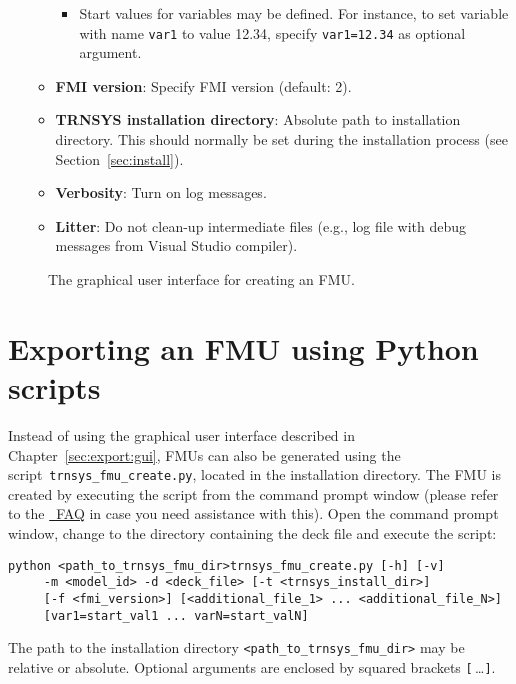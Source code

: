 \begin{enumerate}
\begin{itemize}
\begin{itemize}
      \item Start values for variables may be defined. For instance, to set variable with name \verb!var1! to value 12.34, specify \verb!var1=12.34! as optional argument.
    \end{itemize}
    \item \textbf{FMI version}: Specify FMI version (default: 2).
    \item \textbf{TRNSYS installation directory}: Absolute path to \trnsys installation directory. This should normally be set during the installation process (see Section~\ref{sec:install}).
    \item \textbf{Verbosity}: Turn on log messages.
    \item \textbf{Litter}: Do not clean-up intermediate files (e.g., log file with debug messages from Visual Studio compiler).
  \end{itemize}
\end{enumerate}

\begin{figure}[h]
\caption{The graphical user interface for creating an FMU.}
\label{fig:trnsys_fmu_create_gui}
\end{figure}

\clearpage

\section{Exporting an FMU using Python scripts}
\label{sec:export:command}

Instead of using the graphical user interface described in Chapter~\ref{sec:export:gui}, FMUs can also be generated using the \python script~\texttt{trnsys\_fmu\_create.py}, located in the installation directory.
The FMU is created by executing the script from the command prompt window (please refer to the \href{https://docs.python.org/2/faq/windows.html}{\python~FAQ} in case you need assistance with this).
Open the command prompt window, change to the directory containing the deck file and execute the script:
\begin{verbatim}
python <path_to_trnsys_fmu_dir>trnsys_fmu_create.py [-h] [-v] 
     -m <model_id> -d <deck_file> [-t <trnsys_install_dir>]
     [-f <fmi_version>] [<additional_file_1> ... <additional_file_N>]
     [var1=start_val1 ... varN=start_valN]
  \end{verbatim}
The path to the installation directory \verb!<path_to_trnsys_fmu_dir>! may be relative or absolute.
Optional arguments are enclosed by squared brackets \verb![!$\,$\ldots\verb!]!.

